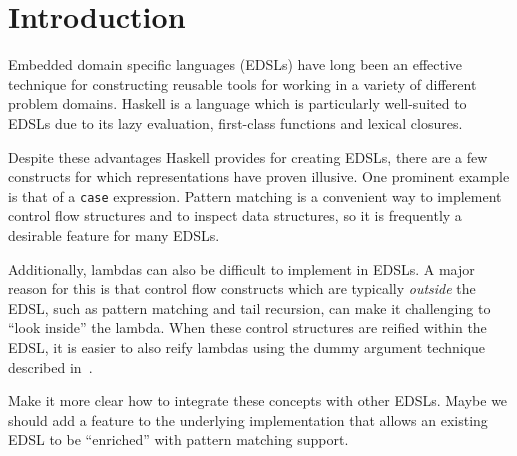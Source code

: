 \documentclass[runningheads, a4paper]{llncs}
\newcommand{\ttt}{\texttt}
\newenvironment{todo}
  {\ifthenelse{\isundefined{\showtodos}}{\comment}{\begin{tcolorbox}
    \textbf{TODO}:}}
  {\ifthenelse{\isundefined{\showtodos}}{\endcomment}{\end{tcolorbox}}
  }
\begin{document}




\section{Introduction}

Embedded domain specific languages (EDSLs) have long been an effective
technique for constructing reusable tools for working in a variety of
different problem domains. Haskell is a language which is particularly
well-suited to EDSLs due to its lazy evaluation, first-class functions and
lexical closures.

Despite these advantages Haskell provides for creating EDSLs, there are a few
constructs for which representations have proven illusive. One prominent example
is that of a \ttt{case} expression. Pattern matching is a convenient way to
implement control flow structures and to inspect data structures, so it is
frequently a desirable feature for many EDSLs.

Additionally, lambdas can also be difficult to implement in EDSLs. A major reason
for this is that control flow constructs which are typically \textit{outside} the EDSL,
such as pattern matching and tail recursion, can make it challenging to ``look inside''
the lambda. When these control structures are reified within the EDSL, it is
easier to also reify lambdas using the dummy argument technique described in~\cite{Elliott:03:CompileDSEL-JFP}.


\begin{todo}
  Make it more clear how to integrate these concepts with other EDSLs. Maybe we should
  add a feature to the underlying implementation that allows an existing EDSL to be
  ``enriched'' with pattern matching support.
\end{todo}
\end{document}
